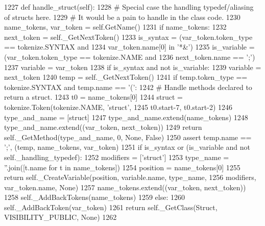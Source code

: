 \begin{DoxyCode}
1227     \textcolor{keyword}{def }handle\_struct(self):
1228         \textcolor{comment}{# Special case the handling typedef/aliasing of structs here.}
1229         \textcolor{comment}{# It would be a pain to handle in the class code.}
1230         name\_tokens, var\_token = self.GetName()
1231         \textcolor{keywordflow}{if} name\_tokens:
1232             next\_token = self.\_GetNextToken()
1233             is\_syntax = (var\_token.token\_type == tokenize.SYNTAX \textcolor{keywordflow}{and}
1234                          var\_token.name[0] \textcolor{keywordflow}{in} \textcolor{stringliteral}{'*&'})
1235             is\_variable = (var\_token.token\_type == tokenize.NAME \textcolor{keywordflow}{and}
1236                            next\_token.name == \textcolor{stringliteral}{';'})
1237             variable = var\_token
1238             \textcolor{keywordflow}{if} is\_syntax \textcolor{keywordflow}{and} \textcolor{keywordflow}{not} is\_variable:
1239                 variable = next\_token
1240                 temp = self.\_GetNextToken()
1241                 \textcolor{keywordflow}{if} temp.token\_type == tokenize.SYNTAX \textcolor{keywordflow}{and} temp.name == \textcolor{stringliteral}{'('}:
1242                     \textcolor{comment}{# Handle methods declared to return a struct.}
1243                     t0 = name\_tokens[0]
1244                     struct = tokenize.Token(tokenize.NAME, \textcolor{stringliteral}{'struct'},
1245                                             t0.start-7, t0.start-2)
1246                     type\_and\_name = [struct]
1247                     type\_and\_name.extend(name\_tokens)
1248                     type\_and\_name.extend((var\_token, next\_token))
1249                     \textcolor{keywordflow}{return} self.\_GetMethod(type\_and\_name, 0, \textcolor{keywordtype}{None}, \textcolor{keyword}{False})
1250                 \textcolor{keyword}{assert} temp.name == \textcolor{stringliteral}{';'}, (temp, name\_tokens, var\_token)
1251             \textcolor{keywordflow}{if} is\_syntax \textcolor{keywordflow}{or} (is\_variable \textcolor{keywordflow}{and} \textcolor{keywordflow}{not} self.\_handling\_typedef):
1252                 modifiers = [\textcolor{stringliteral}{'struct'}]
1253                 type\_name = \textcolor{stringliteral}{''}.join([t.name \textcolor{keywordflow}{for} t \textcolor{keywordflow}{in} name\_tokens])
1254                 position = name\_tokens[0]
1255                 \textcolor{keywordflow}{return} self.\_CreateVariable(position, variable.name, type\_name,
1256                                             modifiers, var\_token.name, \textcolor{keywordtype}{None})
1257             name\_tokens.extend((var\_token, next\_token))
1258             self.\_AddBackTokens(name\_tokens)
1259         \textcolor{keywordflow}{else}:
1260             self.\_AddBackToken(var\_token)
1261         \textcolor{keywordflow}{return} self.\_GetClass(Struct, VISIBILITY\_PUBLIC, \textcolor{keywordtype}{None})
1262 
\end{DoxyCode}
